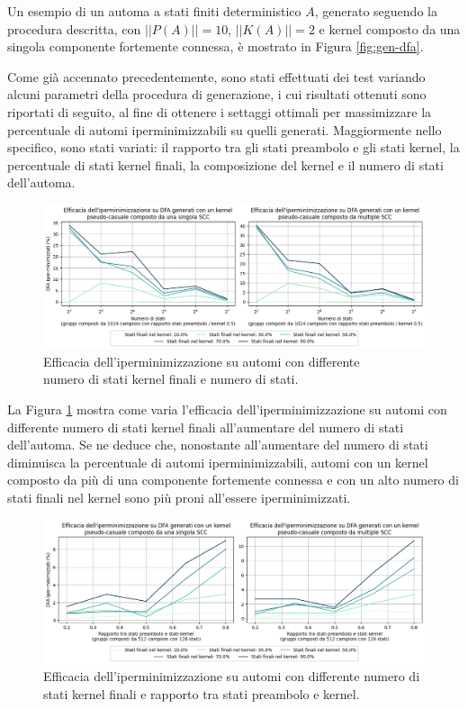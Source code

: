 \documentclass[a4paper,12pt]{report} %
\begin{document}
Un esempio di un automa a stati finiti deterministico $A$, generato seguendo la procedura descritta,
con $||P(A)|| = 10$, $||K(A)|| = 2$ e kernel composto da una singola componente fortemente connessa,
è mostrato in Figura \ref{fig:gen-dfa}.

Come già accennato precedentemente, sono stati effettuati dei test variando alcuni parametri della
procedura di generazione, i cui risultati ottenuti sono riportati di seguito, al fine di ottenere i
settaggi ottimali per massimizzare la percentuale di automi iperminimizzabili su
quelli generati. Maggiormente nello specifico, sono stati variati: il rapporto tra gli stati
preambolo e gli stati kernel, la percentuale di stati kernel finali, la composizione
del kernel e il numero di stati dell'automa.

\begin{figure}[!htb]
  \centering
  \includegraphics[width=1\linewidth]{images/dfa_gen_fstates_nstates.png}
  \caption{\label{fig:dfa-gen-fstates-nstates}Efficacia dell'iperminimizzazione 
  su automi con differente\\numero di stati kernel finali e numero di stati.}
\end{figure}

La Figura \ref{fig:dfa-gen-fstates-nstates} mostra come varia l'efficacia dell'iperminimizzazione 
su automi con differente numero di stati kernel finali all'aumentare del numero di stati dell'automa.
Se ne deduce che, nonostante all'aumentare del numero di stati diminuisca la percentuale di automi
iperminimizzabili, automi con un kernel composto da più di una componente fortemente connessa e con un alto
numero di stati finali nel kernel sono più proni all'essere iperminimizzati.

\begin{figure}[!htb]
  \centering
  \includegraphics[width=1\linewidth]{images/dfa_gen_fstates_pstates.png}
  \caption{\label{fig:dfa-gen-fstates-pstates}Efficacia dell'iperminimizzazione 
  su automi con differente numero di\\stati kernel finali e rapporto tra stati preambolo e kernel.}
\end{figure}
\end{document}
